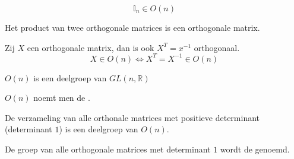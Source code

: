 \documentclass[main.tex]{subfiles}
\begin{document}
\begin{st}
  \[ \mathbb{I}_{n} \in O(n) \] 
\end{st}

\begin{st}
  Het product van twee orthogonale matrices is een orthogonale matrix.
\end{st}

\begin{st}
  Zij $X$ een orthogonale matrix, dan is ook $X^{T}=x^{-1}$ orthogonaal.
  \[ X \in O(n) \Leftrightarrow X^{T} = X^{-1} \in O(n)\]
\end{st}

\begin{st}
  $O(n)$ is een deelgroep van $GL(n,\mathbb{R})$
\end{st}

\begin{de}
  $O(n)$ noemt men de .
\end{de}

\begin{st}
  De verzameling van alle orthonale matrices met positieve determinant (determinant $1$) is een deelgroep van $O(n)$.
\end{st}

\begin{de}
  De groep van alle orthogonale matrices met determinant $1$ wordt de  genoemd.
\end{de}
\end{document}
